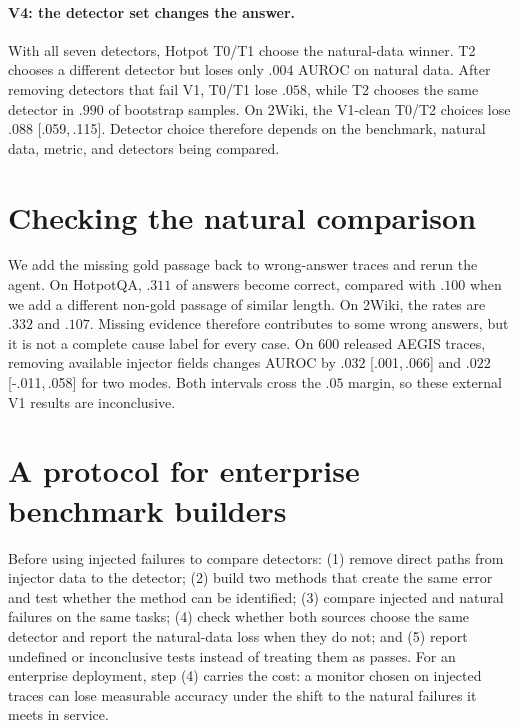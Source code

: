 \documentclass{article}
\newcommand{\ci}[2]{{\footnotesize[#1,\,#2]}}
\begin{document}
\paragraph{V4: the detector set changes the answer.} With all seven detectors, Hotpot T0/T1
choose the natural-data winner. T2 chooses a different detector but loses only $.004$ AUROC on
natural data. After removing detectors that fail V1, T0/T1 lose $.058$, while T2 chooses the
same detector in $.990$ of bootstrap samples. On 2Wiki, the V1-clean T0/T2 choices lose $.088$
\ci{.059}{.115}. Detector choice therefore depends on the benchmark, natural data, metric,
and detectors being compared.

\section{Checking the natural comparison}
We add the missing gold passage back to wrong-answer traces and rerun the agent. On HotpotQA,
$.311$ of answers become correct, compared with $.100$ when we add a different non-gold
passage of similar length. On 2Wiki, the rates are $.332$ and $.107$. Missing evidence
therefore contributes to some wrong answers, but it is not a complete cause label for every
case. On 600 released AEGIS traces, removing available injector fields changes AUROC by $.032$
\ci{.001}{.066} and $.022$ \ci{-.011}{.058} for two modes. Both intervals cross the $.05$
margin, so these external V1 results are inconclusive.

\section{A protocol for enterprise benchmark builders}
Before using injected failures to compare detectors: (1) remove direct paths from injector
data to the detector; (2) build two methods that create the same error and test whether the
method can be identified; (3) compare injected and natural failures on the same tasks; (4)
check whether both sources choose the same detector and report the natural-data loss when they
do not; and (5) report undefined or inconclusive tests instead of treating them as passes.
For an enterprise deployment, step (4) carries the cost: a monitor chosen on injected traces
can lose measurable accuracy under the shift to the natural failures it meets in service.
\end{document}
